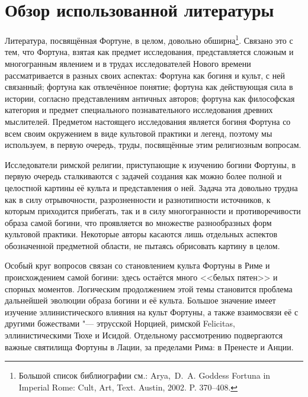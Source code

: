 \chapter*{Обзор использованной литературы}


Литература, посвящённая Фортуне, в целом, довольно обширна\footnote{Большой список библиографии см.: Arya,~D.~A. Goddess Fortuna in Imperial Rome: Cult, Art, Text. Austin, 2002. P. 370--408.}. Связано это с тем, что Фортуна, взятая как предмет исследования, представляется сложным и многогранным явлением и в трудах исследователей Нового времени рассматривается в разных своих аспектах:
Фортуна как богиня и культ, с ней связанный; фортуна как отвлечённое понятие; фортуна как действующая сила в истории, согласно представлениям античных авторов; фортуна как философская категория и предмет специального познавательного исследования древних мыслителей. Предметом настоящего исследования является богиня Фортуна со всем своим окружением в виде культовой практики и легенд, поэтому мы используем, в первую очередь, труды, посвящённые этим религиозным вопросам.


Исследователи римской религии, приступающие к изучению богини Фортуны, в первую очередь сталкиваются с задачей создания как можно более полной и целостной картины её культа и представления о ней. Задача эта довольно трудна как в силу отрывочности, разрозненности и разнотипности источников, к которым приходится прибегать, так и в силу многогранности и противоречивости образа самой богини, что проявляется во множестве разнообразных форм культовой практики. Некоторые авторы касаются лишь отдельных аспектов обозначенной предметной области, не пытаясь обрисовать картину в целом.

Особый круг вопросов связан со становлением культа Фортуны в Риме и происхождением самой богини: здесь остаётся много <<белых пятен>> и спорных моментов. Логическим продолжением этой темы становится проблема дальнейшей эволюции образа богини и её культа. Большое значение имеет изучение эллинистического влияния на культ Фортуны, а также взаимосвязи её с другими божествами "--- этрусской Норцией, римской Felicitas, эллинистическими Тюхе и Исидой. Отдельному рассмотрению подвергаются важные святилища Фортуны в Лации, за пределами Рима: в Пренесте и Анции.

